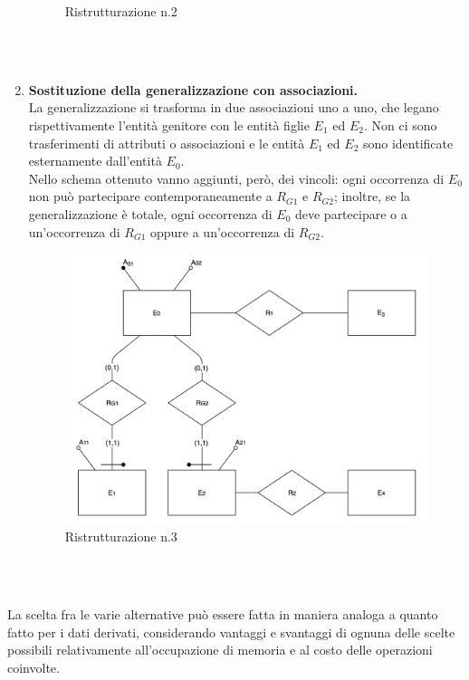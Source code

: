 \begin{enumerate}
{\begin{figure}[h!]
                \caption{Ristrutturazione n.2}
            \end{figure}\\\\}
        \item{\textbf{Sostituzione della generalizzazione con associazioni.}\\
        La generalizzazione si trasforma in due associazioni uno a uno, che legano rispettivamente l'entità genitore con le entità figlie $E_1$ ed $E_2$. Non ci sono trasferimenti di attributi o associazioni e le entità $E_1$ ed $E_2$ sono identificate esternamente dall'entità $E_0$.\\
        Nello schema ottenuto vanno aggiunti, però, dei vincoli: ogni occorrenza di $E_0$ non può partecipare contemporaneamente a $R_{G1}$ e $R_{G2}$; inoltre, se la generalizzazione è totale, ogni occorrenza di $E_0$ deve partecipare o a un'occorrenza di $R_{G1}$ oppure a un'occorrenza di $R_{G2}$.
            \begin{figure}[h!]
                \centering
                \includegraphics[scale=0.6]{15/img3}
                \caption{Ristrutturazione n.3}
            \end{figure}\\\\}
    \end{enumerate}
La scelta fra le varie alternative può essere fatta in maniera analoga a quanto fatto per i dati derivati, considerando vantaggi e svantaggi di ognuna delle scelte possibili relativamente all'occupazione di memoria e al costo delle operazioni coinvolte.\\
